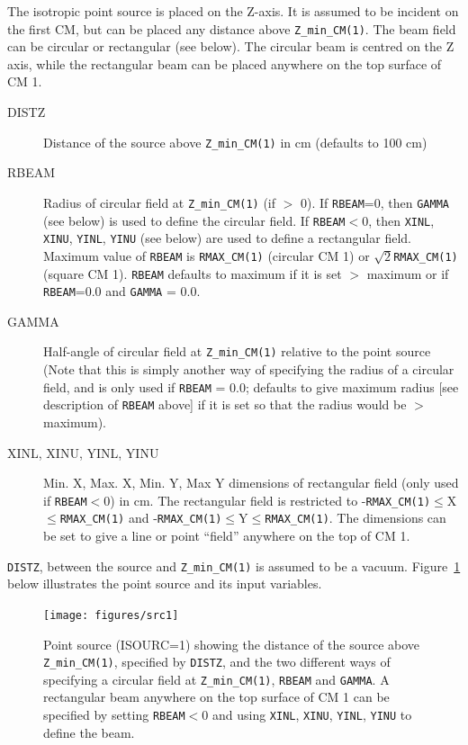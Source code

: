 \documentclass[12pt,twoside]{article}
\begin{document}
The isotropic point source is placed on the Z-axis.  It is
assumed to be incident on the first CM, but can be placed any distance above
\verb+Z_min_CM(1)+.  The beam field can be circular or
rectangular (see below).
The circular beam is centred on the Z axis, while the rectangular beam can
be placed anywhere on the top surface of CM 1.
\begin{description}
\item [DISTZ] Distance of the source above \verb+Z_min_CM(1)+ in cm (defaults to 100 cm)
\item [RBEAM] Radius of circular field at \verb+Z_min_CM(1)+ (if $>$ 0).
If {\tt RBEAM}=0, then {\tt GAMMA} (see below) is used to define the
circular field.  If {\tt RBEAM}$<$0, then
{\tt XINL}, {\tt XINU}, {\tt YINL}, {\tt YINU} (see below) are used to define a
rectangular field.  Maximum value of {\tt RBEAM} is
\verb+RMAX_CM(1)+ (circular CM 1) or $\sqrt{2}$\verb+RMAX_CM(1)+ (square CM 1).
{\tt RBEAM} defaults to maximum if it is set $>$ maximum or if
\verb+RBEAM+=0.0 and \verb+GAMMA+ = 0.0.
\item [GAMMA] Half-angle of circular field
at \verb+Z_min_CM(1)+ relative to the point source
(Note that this is simply another way of specifying the radius of a circular field,
and is only used if \verb+RBEAM+ = 0.0; defaults to give maximum radius [see
description of \verb+RBEAM+ above] if
it is set so that the radius would be $>$ maximum).
\item [XINL, XINU, YINL, YINU] Min. X, Max. X, Min. Y, Max Y dimensions
 of rectangular field (only used if {\tt RBEAM}$<$0) in cm.
The rectangular field
is restricted to -\verb+RMAX_CM(1)+$\leq$X$\leq$\verb+RMAX_CM(1)+ and
-\verb+RMAX_CM(1)+$\leq$Y$\leq$\verb+RMAX_CM(1)+.  The dimensions can be set
to give a line or point ``field'' anywhere on the top of CM 1.
\end{description}
\verb+DISTZ+, between the source and \verb+Z_min_CM(1)+ is assumed to be a vacuum.
Figure~\ref{fig_src1} below illustrates the point source and its input variables.
\begin{figure}[h]
\vspace*{-0.3cm}
\begin{center}
\leavevmode
\mbox{}\hspace{0cm}
\texttt{[image: figures/src1]}
\vspace*{-0.5cm}
\caption[ISOURC=1: Point isotropic source on Z-axis.]
{Point source (ISOURC=1) showing the distance of the source above
{\tt Z\_min\_CM(1)}, specified by {\tt DISTZ}, and the two different ways of
specifying a circular field at {\tt Z\_min\_CM(1)}, {\tt RBEAM}
and {\tt GAMMA}.  A rectangular
beam anywhere on the top surface of CM 1
can be specified by setting {\tt RBEAM}$<$0 and
using {\tt XINL}, {\tt XINU}, {\tt YINL}, {\tt YINU} to define the beam.}
\label{fig_src1}
\end{center}
\end{figure}
\end{document}
